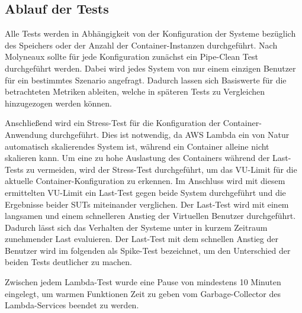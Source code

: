 \subsection{Ablauf der Tests}
Alle Tests werden in Abhängigkeit von der Konfiguration der Systeme bezüglich des Speichers oder der Anzahl der Container-Instanzen durchgeführt.
Nach Molyneaux sollte für jede Konfiguration zunächst ein Pipe-Clean Test durchgeführt werden\cite{molyneaux_art_2014}. Dabei wird jedes System von nur einem einzigen Benutzer für ein bestimmtes Szenario angefragt. Dadurch lassen sich Basiswerte für die betrachteten Metriken ableiten, welche in späteren Tests zu Vergleichen hinzugezogen werden können.

Anschließend wird ein Stress-Test für die Konfiguration der Container-Anwendung durchgeführt. Dies ist notwendig, da AWS Lambda ein von Natur automatisch skalierendes System ist, während ein Container alleine nicht skalieren kann. Um eine zu hohe Auslastung des Containers während der Last-Tests zu vermeiden, wird der Stress-Test durchgeführt, um das VU-Limit für die aktuelle Container-Konfiguration zu erkennen. 
Im Anschluss wird mit diesem ermittelten VU-Limit ein Last-Test gegen beide System durchgeführt und die Ergebnisse beider SUTs miteinander verglichen. 
Der Last-Test wird mit einem langsamen und einem schnelleren Anstieg der Virtuellen Benutzer durchgeführt. Dadurch lässt sich das Verhalten der Systeme unter in kurzem Zeitraum zunehmender Last evaluieren. Der Last-Test mit dem schnellen Anstieg der Benutzer wird im folgenden als Spike-Test bezeichnet, um den Unterschied der beiden Tests deutlicher zu machen. 

Zwischen jedem Lambda-Test wurde eine Pause von mindestens 10 Minuten eingelegt, um warmen Funktionen Zeit zu geben vom Garbage-Collector des Lambda-Services beendet zu werden.